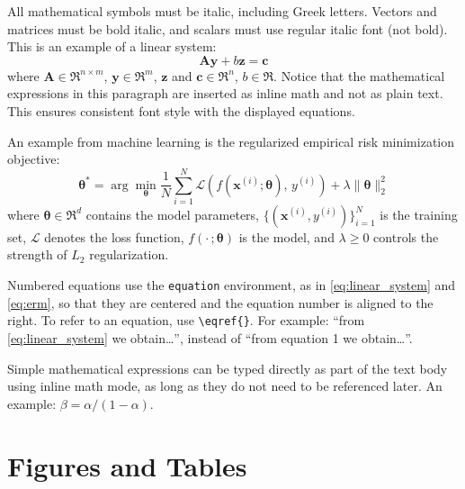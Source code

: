 \documentclass{iteso-irr}
\begin{document}
All mathematical symbols must be italic, including Greek letters. Vectors
and matrices must be bold italic, and scalars must use regular italic font
(not bold). This is an example of a linear system:
%
\begin{equation}
  \bm{A}\bm{y} + b\bm{z} = \bm{c}
  \label{eq:linear_system}
\end{equation}
%
\noindent where $\bm{A} \in \Re^{n \times m}$,
$\bm{y} \in \Re^{m}$,
$\bm{z}$ and $\bm{c} \in \Re^{n}$,
$b \in \Re$.
Notice that the mathematical expressions in this paragraph are inserted
as inline math and not as plain text. This ensures consistent font style
with the displayed equations.

An example from machine learning is the regularized empirical risk
minimization objective:
%
\begin{equation}
  \bm{\theta}^{*}
  = \arg\min_{\bm{\theta}}
    \frac{1}{N} \sum_{i=1}^{N}
    \mathcal{L}\!\left(f(\bm{x}^{(i)}; \bm{\theta}),\, y^{(i)}\right)
    + \lambda \|\bm{\theta}\|_2^2
  \label{eq:erm}
\end{equation}
%
\noindent where $\bm{\theta} \in \Re^{d}$ contains the model parameters,
$\{(\bm{x}^{(i)}, y^{(i)})\}_{i=1}^{N}$ is the training set,
$\mathcal{L}$ denotes the loss function,
$f(\cdot\,; \bm{\theta})$ is the model, and
$\lambda \geq 0$ controls the strength of $L_2$ regularization.

Numbered equations use the \texttt{equation} environment, as in
\eqref{eq:linear_system} and \eqref{eq:erm}, so that they are centered
and the equation number is aligned to the right. To refer to an equation,
use \verb|\eqref{}|. For example: ``from \eqref{eq:linear_system} we
obtain\ldots'', instead of ``from equation 1 we obtain\ldots''.

Simple mathematical expressions can be typed directly as part of the text
body using inline math mode, as long as they do not need to be referenced
later. An example: $\beta = \alpha / (1 - \alpha)$.


\clearpage

\section{Figures and Tables}
\label{sec:figures_tables}
\end{document}
